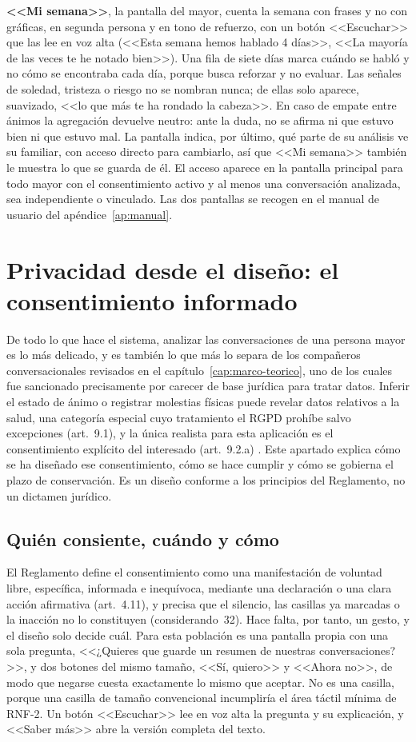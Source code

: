 \textbf{<<Mi semana>>}, la pantalla del mayor, cuenta la semana con frases y no con gráficas, en segunda persona y en tono de refuerzo, con un botón <<Escuchar>> que las lee en voz alta (<<Esta semana hemos hablado 4 días>>, <<La mayoría de las veces te he notado bien>>). Una fila de siete días marca cuándo se habló y no cómo se encontraba cada día, porque busca reforzar y no evaluar. Las señales de soledad, tristeza o riesgo no se nombran nunca; de ellas solo aparece, suavizado, <<lo que más te ha rondado la cabeza>>. En caso de empate entre ánimos la agregación devuelve neutro: ante la duda, no se afirma ni que estuvo bien ni que estuvo mal. La pantalla indica, por último, qué parte de su análisis ve su familiar, con acceso directo para cambiarlo, así que <<Mi semana>> también le muestra lo que se guarda de él. El acceso aparece en la pantalla principal para todo mayor con el consentimiento activo y al menos una conversación analizada, sea independiente o vinculado. Las dos pantallas se recogen en el manual de usuario del apéndice~\ref{ap:manual}.

\section{Privacidad desde el diseño: el consentimiento informado}
\label{sec:privacidad}

De todo lo que hace el sistema, analizar las conversaciones de una persona mayor es lo más delicado, y es también lo que más lo separa de los compañeros conversacionales revisados en el capítulo~\ref{cap:marco-teorico}, uno de los cuales fue sancionado precisamente por carecer de base jurídica para tratar datos. Inferir el estado de ánimo o registrar molestias físicas puede revelar datos relativos a la salud, una categoría especial cuyo tratamiento el RGPD prohíbe salvo excepciones (art.~9.1), y la única realista para esta aplicación es el consentimiento explícito del interesado (art.~9.2.a) \citep{RGPD2016}. Este apartado explica cómo se ha diseñado ese consentimiento, cómo se hace cumplir y cómo se gobierna el plazo de conservación. Es un diseño conforme a los principios del Reglamento, no un dictamen jurídico.

\subsection{Quién consiente, cuándo y cómo}

El Reglamento define el consentimiento como una manifestación de voluntad libre, específica, informada e inequívoca, mediante una declaración o una clara acción afirmativa (art.~4.11), y precisa que el silencio, las casillas ya marcadas o la inacción no lo constituyen (considerando~32). Hace falta, por tanto, un gesto, y el diseño solo decide cuál. Para esta población es una pantalla propia con una sola pregunta, <<¿Quieres que guarde un resumen de nuestras conversaciones?>>, y dos botones del mismo tamaño, <<Sí, quiero>> y <<Ahora no>>, de modo que negarse cuesta exactamente lo mismo que aceptar. No es una casilla, porque una casilla de tamaño convencional incumpliría el área táctil mínima de RNF-2. Un botón <<Escuchar>> lee en voz alta la pregunta y su explicación, y <<Saber más>> abre la versión completa del texto.

